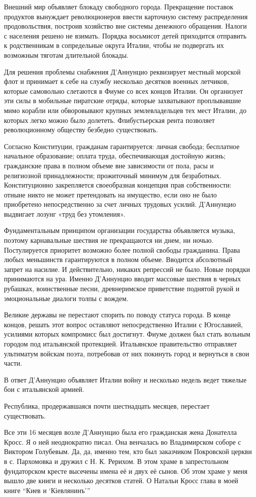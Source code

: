 Внешний мир объявляет блокаду свободного города. Прекращение поставок продуктов
вынуждает революционеров ввести карточную систему распределения продовольствия,
построив хозяйство вне системы денежного обращения. Налоги с населения решено
не взимать. Порядка восьмисот детей приходится отправить к родственникам в
сопредельные округа Италии, чтобы не подвергать их возможным тяготам длительной
блокады. 

Для решения проблемы снабжения Д'Аннунцио реквизирует местный морской флот и
принимает к себе на службу несколько десятков военных летчиков, которые
самовольно слетаются в Фиуме со всех концов Италии. Он организует эти силы в
мобильные пиратские отряды, которые захватывают проплывавшие мимо корабли или
обворовывают крупных землевладельцев тех мест Италии, до которых легко можно
было долететь. Флибустьерская рента позволяет революционному обществу безбедно
существовать.

Согласно Конституции, гражданам гарантируется: личная свобода; бесплатное
начальное образование; оплата труда, обеспечивающая достойную жизнь;
гражданские права в полном объеме вне зависимости от пола, расы и религиозной
принадлежности; прожиточный минимум для безработных. Конституционно
закрепляется своеобразная концепция прав собственности: отныне никто не может
претендовать на имущество, если оно не было приобретено непосредственно за счет
личных трудовых усилий. Д'Аннунцио выдвигает лозунг «труд без утомления».

Фундаментальным принципом организации государства объявляется музыка, поэтому
карнавальные шествия не прекращаются ни днем, ни ночью. Постулируется приоритет
возможно более полной свободы гражданина. Права любых меньшинств гарантируются
в полном объеме. Вводится абсолютный запрет на насилие. И действительно,
никаких репрессий не было. Новые порядки принимаются на ура. Именно Д’Аннунцио
вводит массовые шествия в черных рубашках, воинственные песни, древнеримское
приветствие поднятой рукой и эмоциональные диалоги толпы с вождем. 

Великие державы не перестают спорить по поводу статуса города. В конце концов,
решать этот вопрос оставляют непосредственно Италии с Югославией, усилиями
которых компромисс был достигнут. Фиуме должен был стать вольным городом под
итальянской протекцией. Итальянское правительство отправляет ультиматум войскам
поэта, потребовав от них покинуть город и вернуться в свои части. 

В ответ Д'Аннунцио объявляет Италии войну и несколько недель ведет тяжелые бои
с итальянской армией.

Республика, продержавшаяся почти шестнадцать месяцев, перестает существовать.

Все эти 16 месяцев возле Д'Аннунцио была его гражданская жена Донателла Кросс.
Я о ней неоднократно писал. Она венчалась во Владимирском соборе с Виктором
Голубевым. Да, да, именно тем, кто был заказчиком Покровской церкви в с.
Пархомовка и дружил с Н. К. Рерихом. В этом храме в запрестольном фундаторском
кресте высечены имена её и двух её сынов. Об этом храме у меня вышло две книги
и несколько десятков статей. О Натальи Кросс глава в моей книге \enquote{Киев и
\enquote{Кіевлянинъ}}
